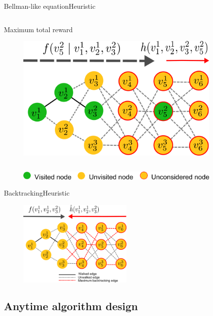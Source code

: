 \begin{frame}{Bellman-like equation}{Heuristic}
\begin{columns}
\begin{block}{Maximum total reward}
\begin{figure}
\centering
\includegraphics[width = 0.9\textwidth]{./figure/DefineFuncP}
\end{figure}
\end{block}
\end{columns}

\begin{figure}
\centering
\includegraphics[width = 0.9\textwidth]{./figure/DefineFuncHelp}
\end{figure}

\end{frame}

\begin{frame}{Backtracking}{Heuristic}

\begin{figure}
\centering
\includegraphics[width = 0.5\textwidth]{./figure/backtracking}
\end{figure}

\end{frame}

\subsection{Anytime algorithm design}

